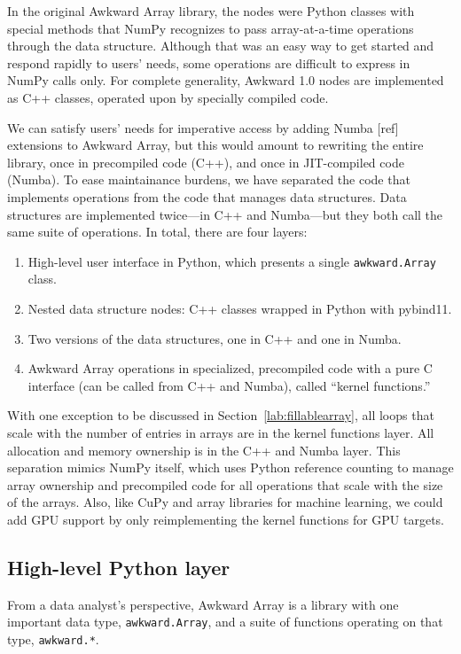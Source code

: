 \documentclass{webofc}
\begin{document}
In the original Awkward Array library, the nodes were Python classes with special methods that NumPy recognizes to pass array-at-a-time operations through the data structure. Although that was an easy way to get started and respond rapidly to users' needs, some operations are difficult to express in NumPy calls only. For complete generality, Awkward 1.0 nodes are implemented as C++ classes, operated upon by specially compiled code.

We can satisfy users' needs for imperative access by adding Numba [ref] extensions to Awkward Array, but this would amount to rewriting the entire library, once in precompiled code (C++), and once in JIT-compiled code (Numba). To ease maintainance burdens, we have separated the code that implements operations from the code that manages data structures. Data structures are implemented twice---in C++ and Numba---but they both call the same suite of operations. In total, there are four layers:

\begin{enumerate}
\item High-level user interface in Python, which presents a single \texttt{awkward.Array} class.
\item Nested data structure nodes: C++ classes wrapped in Python with pybind11.
\item Two versions of the data structures, one in C++ and one in Numba.
\item Awkward Array operations in specialized, precompiled code with a pure C interface (can be called from C++ and Numba), called ``kernel functions.''
\end{enumerate}

\noindent With one exception to be discussed in Section~\ref{lab:fillablearray}, all loops that scale with the number of entries in arrays are in the kernel functions layer. All allocation and memory ownership is in the C++ and Numba layer. This separation mimics NumPy itself, which uses Python reference counting to manage array ownership and precompiled code for all operations that scale with the size of the arrays. Also, like CuPy and array libraries for machine learning, we could add GPU support by only reimplementing the kernel functions for GPU targets.

\subsection{High-level Python layer}

From a data analyst's perspective, Awkward Array is a library with one important data type, \texttt{awkward.Array}, and a suite of functions operating on that type, \texttt{awkward.*}.
\end{document}
